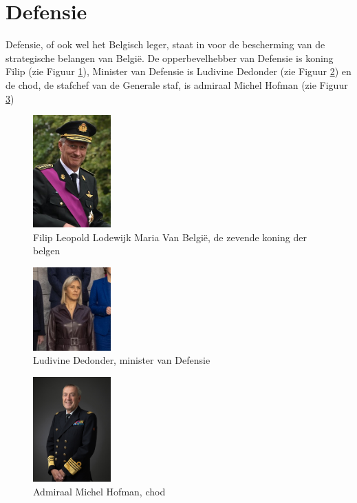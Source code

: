 
\section{Defensie}
\label{sec:defensie}

Defensie, of ook wel het Belgisch leger, staat in voor de bescherming van de strategische belangen van België. De opperbevelhebber van Defensie is koning Filip (zie Figuur \ref{fig:koning_filip}), Minister van Defensie is Ludivine Dedonder (zie Figuur \ref{fig:mod}) en de \gls{chod}, de stafchef van de Generale staf, is admiraal Michel Hofman (zie Figuur \ref{fig:chod})~\autocite{Wikipedia2022a}

\begin{figure}
    \includegraphics[width=3cm]{img/koning_filip.jpg}
    \caption{\label{fig:koning_filip}Filip Leopold Lodewijk Maria Van België, de zevende koning der belgen~\autocite{Wikipedia2022}}
\end{figure}

\begin{figure}
    \includegraphics[width=3cm]{img/Ludivine_Dedonder.jpg}
    \caption{\label{fig:mod}Ludivine Dedonder, minister van Defensie~\autocite{Wikipedia2022c}}
\end{figure}

\begin{figure}
    \includegraphics[width=3cm]{img/michel_hofman.jpg}
    \caption{\label{fig:chod}Admiraal Michel Hofman, \gls{chod}~\autocite{Nato2020}}
\end{figure}

